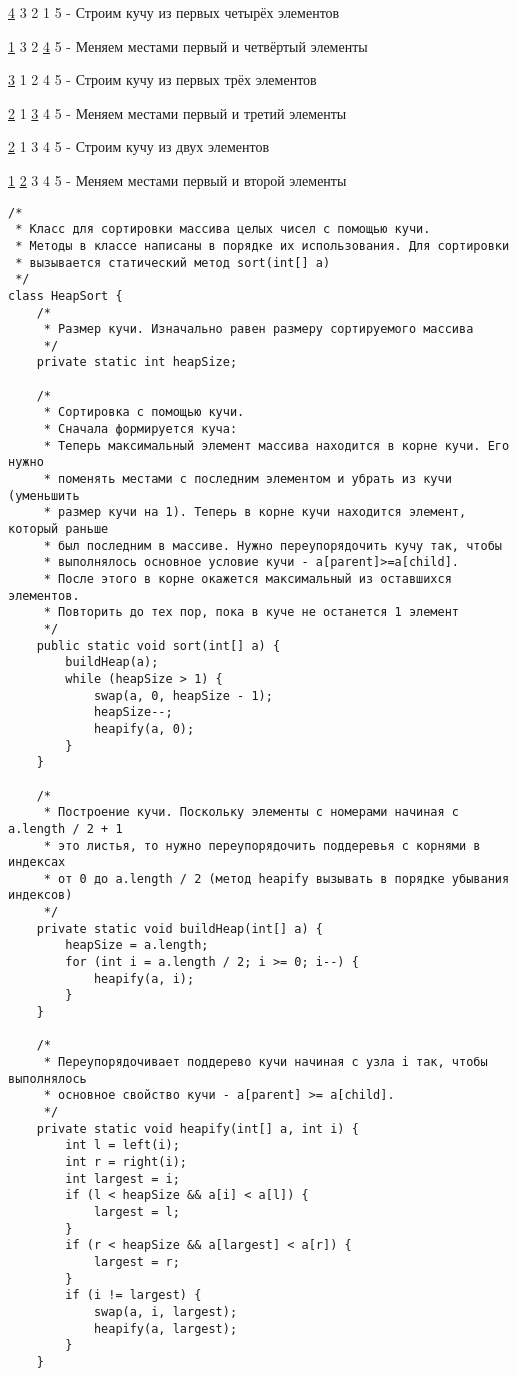 \documentclass[12pt]{matmex-diploma}
\begin{document}
            \underline{4} 3 2 1 5   - Строим кучу из первых четырёх элементов
            
            \underline{1} 3 2 \underline{4} 5   - Меняем местами первый и четвёртый элементы
            
            \underline{3} 1 2 4 5   - Строим кучу из первых трёх элементов
            
            \underline{2} 1 \underline{3} 4 5   - Меняем местами первый и третий элементы
            
            \underline{2} 1 3 4 5   - Строим кучу из двух элементов
            
            \underline{1} \underline{2} 3 4 5   - Меняем местами первый и второй элементы
            
            \begin{verbatim}
/*
 * Класс для сортировки массива целых чисел с помощью кучи.
 * Методы в классе написаны в порядке их использования. Для сортировки 
 * вызывается статический метод sort(int[] a)
 */
class HeapSort {
    /*
     * Размер кучи. Изначально равен размеру сортируемого массива
     */
    private static int heapSize;
    
    /*
     * Сортировка с помощью кучи.
     * Сначала формируется куча:
     * Теперь максимальный элемент массива находится в корне кучи. Его нужно 
     * поменять местами с последним элементом и убрать из кучи (уменьшить 
     * размер кучи на 1). Теперь в корне кучи находится элемент, который раньше
     * был последним в массиве. Нужно переупорядочить кучу так, чтобы 
     * выполнялось основное условие кучи - a[parent]>=a[child].
     * После этого в корне окажется максимальный из оставшихся элементов.
     * Повторить до тех пор, пока в куче не останется 1 элемент
     */
    public static void sort(int[] a) {
        buildHeap(a);
        while (heapSize > 1) {
            swap(a, 0, heapSize - 1);
            heapSize--;
            heapify(a, 0);
        }
    }
    
    /*
     * Построение кучи. Поскольку элементы с номерами начиная с a.length / 2 + 1
     * это листья, то нужно переупорядочить поддеревья с корнями в индексах
     * от 0 до a.length / 2 (метод heapify вызывать в порядке убывания индексов)
     */
    private static void buildHeap(int[] a) {
        heapSize = a.length;
        for (int i = a.length / 2; i >= 0; i--) {
            heapify(a, i);
        }
    }
    
    /*
     * Переупорядочивает поддерево кучи начиная с узла i так, чтобы выполнялось 
     * основное свойство кучи - a[parent] >= a[child].
     */
    private static void heapify(int[] a, int i) {
        int l = left(i);
        int r = right(i);
        int largest = i;
        if (l < heapSize && a[i] < a[l]) {
            largest = l;
        } 
        if (r < heapSize && a[largest] < a[r]) {
            largest = r;
        }
        if (i != largest) {
            swap(a, i, largest);
            heapify(a, largest);
        }
    }
    

\end{verbatim}
\end{document}
